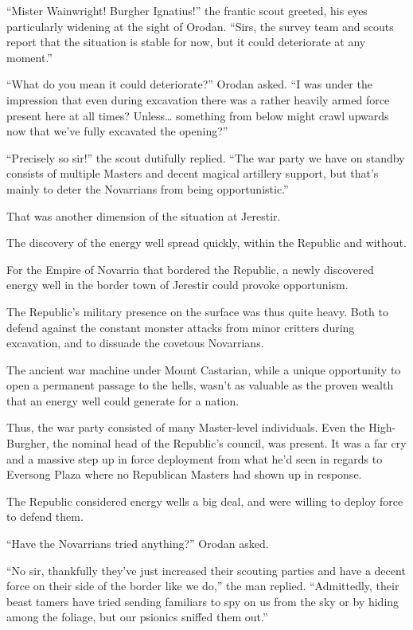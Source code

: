 \documentclass[a4paper,10pt]{book}
\begin{document}
“Mister Wainwright! Burgher Ignatius!” the frantic scout greeted, his eyes particularly widening at the sight of Orodan. “Sirs, the survey team and scouts report that the situation is stable for now, but it could deteriorate at any moment.”\par
“What do you mean it could deteriorate?” Orodan asked. “I was under the impression that even during excavation there was a rather heavily armed force present here at all times? Unless… something from below might crawl upwards now that we’ve fully excavated the opening?”\par
“Precisely so sir!” the scout dutifully replied. “The war party we have on standby consists of multiple Masters and decent magical artillery support, but that’s mainly to deter the Novarrians from being opportunistic.”\par
That was another dimension of the situation at Jerestir.\par
The discovery of the energy well spread quickly, within the Republic and without.\par
For the Empire of Novarria that bordered the Republic, a newly discovered energy well in the border town of Jerestir could provoke opportunism.\par
The Republic’s military presence on the surface was thus quite heavy. Both to defend against the constant monster attacks from minor critters during excavation, and to dissuade the covetous Novarrians.\par
The ancient war machine under Mount Castarian, while a unique opportunity to open a permanent passage to the hells, wasn’t as valuable as the proven wealth that an energy well could generate for a nation.\par
Thus, the war party consisted of many Master-level individuals. Even the High-Burgher, the nominal head of the Republic’s council, was present. It was a far cry and a massive step up in force deployment from what he’d seen in regards to Eversong Plaza where no Republican Masters had shown up in response.\par
The Republic considered energy wells a big deal, and were willing to deploy force to defend them.\par
“Have the Novarrians tried anything?” Orodan asked.\par
“No sir, thankfully they’ve just increased their scouting parties and have a decent force on their side of the border like we do,” the man replied. “Admittedly, their beast tamers have tried sending familiars to spy on us from the sky or by hiding among the foliage, but our psionics sniffed them out.”\par
\end{document}
